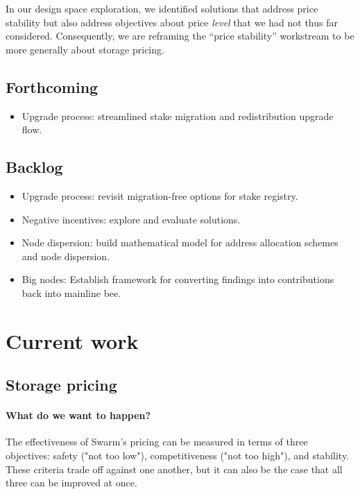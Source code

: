 In our design space exploration, we identified solutions that address price stability but also address objectives about price \emph{level} that we had not thus far considered.
%
Consequently, we are reframing the ``price stability'' workstream to be more generally about storage pricing.

\subsection*{Forthcoming}

\begin{itemize}
  \item Upgrade process: streamlined stake migration and redistribution upgrade flow.
\end{itemize}

\subsection*{Backlog}
\begin{itemize}
  \item Upgrade process: revisit migration-free options for stake registry.
  \item Negative incentives: explore and evaluate solutions.
  \item Node dispersion: build mathematical model for address allocation schemes and node dispersion.
  \item Big nodes: Establish framework for converting findings into contributions back into mainline bee.
\end{itemize}


\section*{Current work}

\subsection*{Storage pricing}

\paragraph{What do we want to happen?}

The effectiveness of Swarm's pricing can be measured in terms of three objectives: safety ("not too low"), competitiveness ("not too high"), and stability. 
%
These criteria trade off against one another, but it can also be the case that all three can be improved at once.


